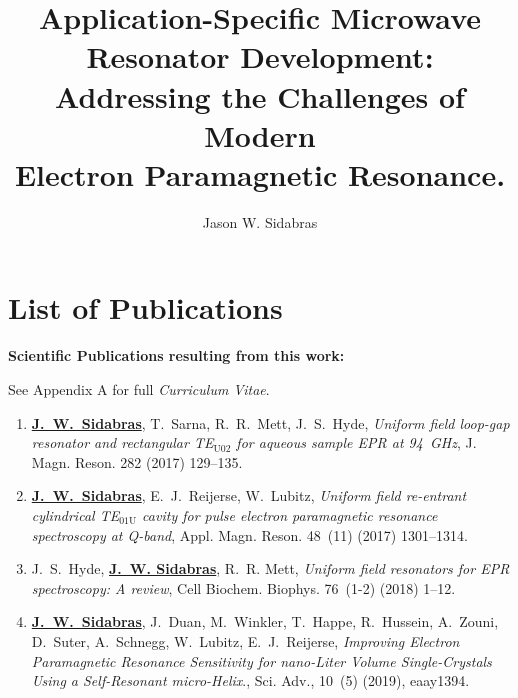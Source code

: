 \documentclass[11pt,DIV=14,a4paper,openany,twoside=semi,english,titlepage=true,BCOR=1cm]{scrbook}
\author{Jason W. Sidabras}
\title{\textbf{Application-Specific Microwave Resonator Development:} \\ Addressing the Challenges of Modern \\ Electron Paramagnetic Resonance.}
\begin{document}
\raggedbottom

\maketitle

%





\newpage

\chapter*{List of Publications}

\textbf{Scientific Publications resulting from this work: }

See Appendix A for full \textit{Curriculum Vitae}.
\begin{enumerate}
\itemsep0em
    \item \textbf{\underline{J.~W.~Sidabras}}, T.~Sarna, R.~R.~Mett, J.~S.~Hyde, {\em Uniform field loop-gap
  resonator and rectangular {TE}$_{\text{{U}02}}$ for aqueous sample {EPR} at 94~{GHz}}, J. Magn. Reson. 282 (2017) 129--135.
    \item \textbf{\underline{J.~W.~Sidabras}}, E.~J.~Reijerse, W.~Lubitz, {\em Uniform field re-entrant cylindrical
  {TE}$_{\text{01{U}}}$ cavity for pulse electron paramagnetic resonance spectroscopy at {Q}-band}, Appl. Magn. Reson. 48~(11) (2017) 1301--1314.
    \item J.~S.~Hyde, \textbf{\underline{J.~W. Sidabras}}, R.~R. Mett, {\em Uniform field resonators for {EPR}
  spectroscopy: A review}, Cell Biochem. Biophys. 76~(1-2) (2018) 1--12.
    \item \textbf{\underline{J.~W.~Sidabras}}, J.~Duan, M.~Winkler, T.~Happe, R.~Hussein, A.~Zouni, D.~Suter,
  A.~Schnegg, W.~Lubitz, E.~J.~Reijerse, {\em Improving Electron Paramagnetic Resonance Sensitivity for nano-Liter Volume Single-Crystals Using a Self-Resonant micro-Helix}., Sci. Adv., 10~(5) (2019), eaay1394.
\end{enumerate}
\end{document}
